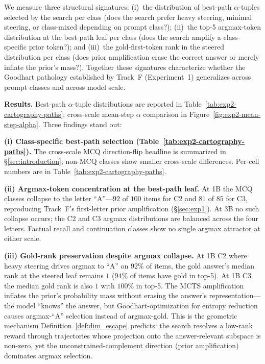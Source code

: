 \documentclass{article}
\begin{document}
We measure three structural signatures: (i)~the distribution of best-path $\alpha$-tuples selected by the search per class (does the search prefer heavy steering, minimal steering, or class-mixed depending on prompt class?); (ii)~the top-5 argmax-token distribution at the best-path leaf per class (does the search amplify a class-specific prior token?); and (iii)~the gold-first-token rank in the steered distribution per class (does prior amplification erase the correct answer or merely inflate the prior's mass?). Together these signatures characterize whether the Goodhart pathology established by Track~F (Experiment~1) generalizes across prompt classes and across model scale.

\textbf{Results.} Best-path $\alpha$-tuple distributions are reported in Table~\ref{tab:exp2-cartography-paths}; cross-scale mean-step $\alpha$ comparison in Figure~\ref{fig:exp2-mean-step-alpha}. Three findings stand out:

\textbf{(i) Class-specific best-path selection (Table~\ref{tab:exp2-cartography-paths}).} The cross-scale MCQ direction-flip headline is summarized in §\ref{sec:introduction}; non-MCQ classes show smaller cross-scale differences. Per-cell numbers are in Table~\ref{tab:exp2-cartography-paths}.

\textbf{(ii) Argmax-token concentration at the best-path leaf.} At 1B the MCQ classes collapse to the letter ``A''---$92$ of $100$ items for C2 and $81$ of $85$ for C3, reproducing Track~F's first-letter prior amplification (§\ref{sec:exp1}). At 3B no such collapse occurs; the C2 and C3 argmax distributions are balanced across the four letters. Factual recall and continuation classes show no single argmax attractor at either scale.

\textbf{(iii) Gold-rank preservation despite argmax collapse.} At 1B C2 where heavy steering drives argmax to ``A'' on $92\%$ of items, the gold answer's median rank at the steered leaf remains $1$ ($94\%$ of items have gold in top-5). At 1B C3 the median gold rank is also $1$ with $100\%$ in top-5. The MCTS amplification inflates the prior's probability mass without erasing the answer's representation---the model ``knows'' the answer, but Goodhart-optimization for entropy reduction causes argmax-``A'' selection instead of argmax-gold. This is the geometric mechanism Definition~\ref{def:dim_escape} predicts: the search resolves a low-rank reward through trajectories whose projection onto the answer-relevant subspace is non-zero, yet the unconstrained-complement direction (prior amplification) dominates argmax selection.
\end{document}
